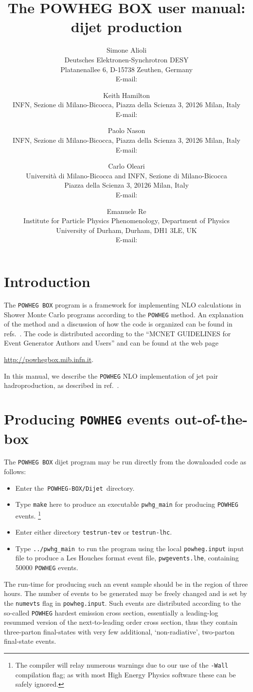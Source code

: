 \documentclass[paper]{JHEP3}
\title{The POWHEG BOX user manual:\\
  dijet production} \vfill
\author{Simone Alioli\\
  Deutsches Elektronen-Synchrotron DESY\\
  Platanenallee 6, D-15738 Zeuthen, Germany\\
  E-mail: \email{simone.alioli@desy.de}}
\author{Keith Hamilton\\
  INFN, Sezione di Milano-Bicocca,
  Piazza della Scienza 3, 20126 Milan, Italy\\
  E-mail: \email{Keith.Hamilton@mib.infn.it}}
\author{Paolo Nason\\
  INFN, Sezione di Milano-Bicocca,
  Piazza della Scienza 3, 20126 Milan, Italy\\
  E-mail: \email{Paolo.Nason@mib.infn.it}}
\author{Carlo Oleari\\
  Universit\`a di Milano-Bicocca and INFN, Sezione di Milano-Bicocca\\
  Piazza della Scienza 3, 20126 Milan, Italy\\
  E-mail: \email{Carlo.Oleari@mib.infn.it}}
\author{Emanuele Re\\
  Institute for Particle Physics Phenomenology, Department of Physics\\
  University of Durham, Durham, DH1 3LE, UK\\
  E-mail: \email{emanuele.re@durham.ac.uk}}
\newcommand\POWHEG{{\tt POWHEG}}
\newcommand\POWHEGBOX{{\tt POWHEG BOX}}
\begin{document}
\section{Introduction}

The \POWHEGBOX{} program is a framework for implementing NLO
calculations in Shower Monte Carlo programs according to the
\POWHEG{} method. An explanation of the method and a discussion of
how the code is organized can be found in
refs.~\cite{Nason:2004rx,Frixione:2007vw,Alioli:2010xd}.  The code is
distributed according to the ``MCNET GUIDELINES for Event Generator
Authors and Users'' and can be found at the web page 
%
\begin{center}
 \url{http://powhegbox.mib.infn.it}.
\end{center}
%
In this manual, we describe the \POWHEG{} NLO implementation of jet pair
hadroproduction, as described in ref.~\cite{Alioli:2010xa}.


\section{Producing \POWHEG{} events out-of-the-box}

The \POWHEGBOX{} dijet program may be run directly
from the downloaded code as follows:
\begin{itemize}
\item Enter the\texttt{ POWHEG-BOX/Dijet }directory.
\item Type \texttt{make} here to produce an executable \texttt{pwhg\_main}
for producing \POWHEG{} events.%
\footnote{The compiler will relay numerous warnings due to our use of the \texttt{-Wall}
compilation flag; as with most High Energy Physics software these
can be safely ignored.%
}
\item Enter either directory \texttt{testrun-tev} or \texttt{testrun-lhc}. 
\item Type \texttt{../pwhg\_main }to run the program using the local \texttt{powheg.input}
input file to produce a Les Houches format event file, \texttt{pwgevents.lhe},
containing 50000 \POWHEG{} events.
\end{itemize}
The run-time for producing such an event sample should be in the region
of three hours. The number of events to be generated may be freely
changed and is set by the \texttt{numevts} flag in \texttt{powheg.input}.
Such events are distributed according to the so-called \POWHEG{}
hardest emission cross section, essentially a leading-log resummed
version of the next-to-leading order cross section, thus they contain
three-parton final-states with very few additional, `non-radiative',
two-parton final-state events.
\end{document}
